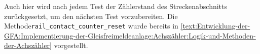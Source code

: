 Auch hier wird nach jedem Test der Zählerstand des Streckenabschnitts zurückgesetzt, um den nächsten Test vorzubereiten. Die Methode\newline\texttt{rail\_contact\_counter\_reset} wurde bereits in \autoref{text:Entwicklung-der-GFA:Implementierung-der-Gleisfreimeldeanlage:Achszähler:Logik-und-Methoden-der-Achszähler}  vorgestellt.
